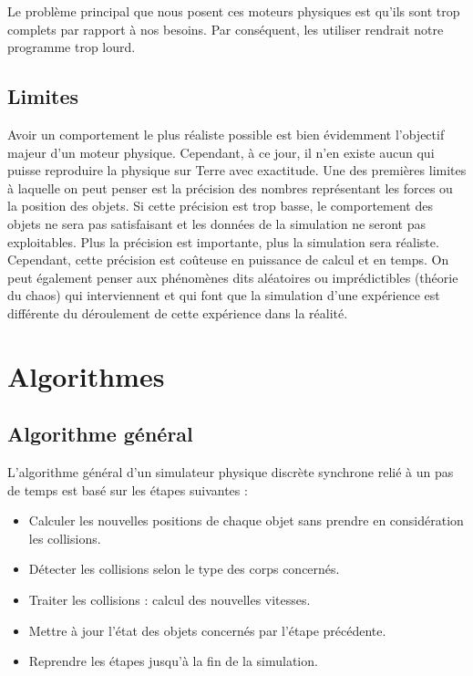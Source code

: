 \documentclass{report}
\begin{document}
Le problème principal que nous posent ces moteurs physiques est qu’ils sont trop complets par rapport à nos besoins. Par conséquent, les utiliser rendrait notre programme trop lourd.


\subsection{Limites}

Avoir un comportement le plus réaliste possible est bien évidemment l’objectif majeur d’un moteur physique. Cependant, à ce jour, il n’en existe aucun qui puisse reproduire la physique sur Terre avec exactitude. Une des premières limites à laquelle on peut penser est la précision des nombres représentant les forces ou la position des objets. Si cette précision est trop basse, le comportement des objets ne sera pas satisfaisant et les données de la simulation ne seront pas exploitables. Plus la précision est importante, plus la simulation sera réaliste. Cependant, cette précision est coûteuse en puissance de calcul et en temps. On peut également penser aux phénomènes dits aléatoires ou imprédictibles (théorie du chaos) qui interviennent et qui font que la simulation d’une expérience est différente du déroulement de cette expérience dans la réalité.

\section{Algorithmes}

\subsection{Algorithme général}

L'algorithme général d’un simulateur physique discrète synchrone relié à un pas de temps est basé sur les étapes suivantes :
\begin{itemize}
\item Calculer les nouvelles positions de chaque objet sans prendre en considération les collisions.
\item Détecter les collisions selon le type des corps concernés.
\item Traiter les collisions : calcul des nouvelles vitesses.
\item Mettre à jour l’état des objets concernés par l’étape précédente.
\item Reprendre les étapes jusqu’à la fin de la simulation.
\end{itemize}
\end{document}
